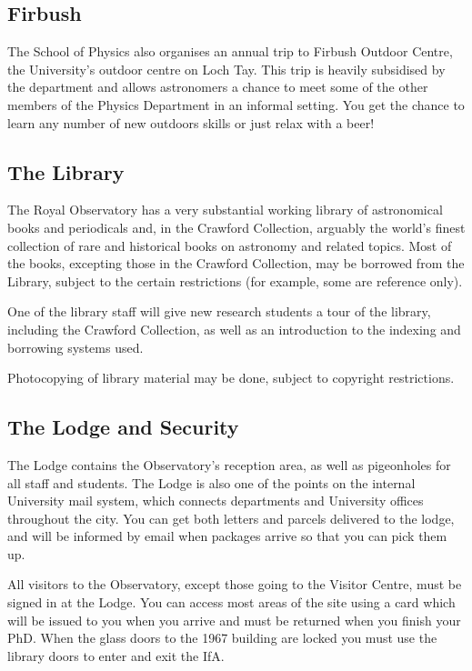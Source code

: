 \subsection{Firbush}

The School of Physics also organises an annual trip to Firbush Outdoor Centre, the University's outdoor centre on Loch Tay. This trip is heavily subsidised by the department and allows astronomers a chance to meet some of the other members of the Physics Department in an informal setting. You get the chance to learn any number of new outdoors skills or just relax with a beer!

\subsection{The Library}

The Royal Observatory has a very substantial working library of
astronomical books and periodicals and, in the Crawford Collection,
arguably the world's finest collection of rare and historical books on
astronomy and related topics. Most of the books, excepting those in
the Crawford Collection, may be borrowed from the Library, subject to
the certain restrictions (for example, some are reference only).

One of the library staff will give new research students a tour of the
library, including the Crawford Collection, as well as an
introduction to the indexing and borrowing systems used.

Photocopying of library material may be done, subject to copyright
restrictions.
 
\subsection{The Lodge and Security}

The Lodge contains the Observatory's reception area, as well as
pigeonholes for all staff and students. The Lodge is
also one of the points on the internal University mail system, which
connects departments and University offices throughout the city. You can get both letters and parcels delivered to the lodge, and will be informed by email when packages arrive so that you can pick them up.

All visitors to the Observatory, except those going to the Visitor
Centre, must be signed in at the Lodge.  You
can access most areas of the site using a card which will be issued 
to you when you
arrive and must be returned when you finish your PhD. When the glass
doors to the 1967 building are locked you must use the
library doors to enter and exit the IfA. 

